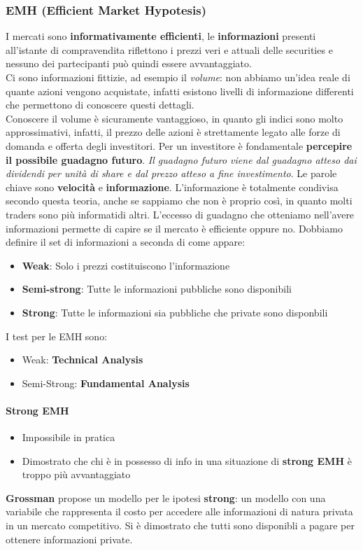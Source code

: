 \documentclass[12pt]{article}
\begin{document}
\subsubsection{EMH (Efficient Market Hypotesis)}
I mercati sono \textbf{informativamente efficienti}, le \textbf{informazioni} presenti all'istante di compravendita riflettono i prezzi veri e attuali delle securities e nessuno dei partecipanti può quindi essere avvantaggiato. \\Ci sono informazioni fittizie, ad esempio il \textit{volume}: non abbiamo un’idea reale di quante azioni vengono acquistate, infatti esistono livelli di informazione differenti che permettono di conoscere questi dettagli.\\Conoscere  il  volume  è  sicuramente  vantaggioso,  in  quanto  gli  indici  sono  molto  approssimativi, infatti, il prezzo delle azioni è strettamente legato alle forze di domanda e offerta degli investitori. Per un investitore è fondamentale \textbf{percepire il possibile guadagno futuro}. \textit{Il guadagno futuro viene dal guadagno atteso dai dividendi per unità di share e dal prezzo atteso a fine investimento}. Le parole chiave sono \textbf{velocità} e \textbf{informazione}. L’informazione è totalmente condivisa secondo questa teoria, anche se sappiamo che non è proprio così, in quanto molti traders sono più  informatidi altri.  L’eccesso di guadagno che otteniamo nell’avere informazioni permette di capire se il mercato è efficiente oppure no. Dobbiamo definire il set di informazioni a seconda di come appare:
\begin{itemize}
    \item \textbf{Weak}: Solo i prezzi costituiscono l'informazione
    \item \textbf{Semi-strong}: Tutte le informazioni pubbliche sono disponibili
    \item \textbf{Strong}: Tutte le informazioni sia pubbliche che private sono disponbili
\end{itemize}
I test per le EMH sono:
\begin{itemize}
    \item Weak: \textbf{Technical Analysis}
    \item Semi-Strong: \textbf{Fundamental Analysis}
\end{itemize}
\paragraph{Strong EMH}
\begin{itemize}
    \item Impossibile in pratica
    \item Dimostrato che chi è in possesso di info in una situazione di \textbf{strong EMH} è troppo più avvantaggiato
\end{itemize}
\textbf{Grossman} propose un modello per le ipotesi \textbf{strong}: un modello con una variabile che rappresenta il costo per accedere alle informazioni di natura  privata in un  mercato competitivo. Si è dimostrato che tutti sono disponibli a pagare per ottenere informazioni private.
\end{document}
